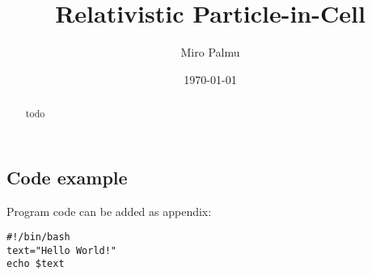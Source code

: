 \documentclass[english,twoside,openright]{UH_DS_MSc}
\title{Relativistic Particle-in-Cell}
\author{Miro Palmu}
\date{\today}
\begin{document}
\maketitle


\begin{abstract}
  todo
\end{abstract}

\mytableofcontents

\mynomenclature







\cleardoublepage %



\begin{appendices}
\myappendixtitle

\chapter{Code example}
Program code can be added as appendix:
\begin{verbatim}
#!/bin/bash
text="Hello World!"
echo $text
\end{verbatim}

\end{appendices}
\end{document}
